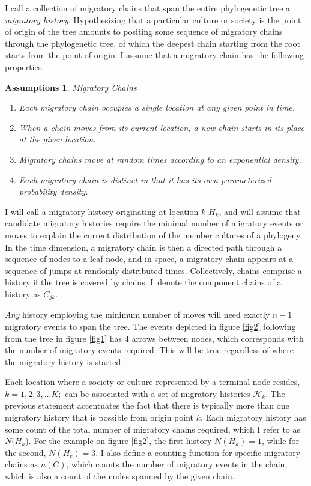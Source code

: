 \documentclass[11pt]{article}
\newtheorem{assumptions}{Assumptions}
\begin{document}
 I call a  collection of migratory chains that span the entire phylogenetic tree a \textit{migratory history}. Hypothesizing that a particular culture or society is the point of origin of the tree amounts to positing some sequence of migratory chains through the phylogenetic tree, of which the deepest chain starting from the root starts from the point of origin. I assume that a migratory chain has the following properties.

\begin{assumptions}{Migratory Chains}    
\begin{enumerate}
\item Each migratory chain occupies a single location at any given point in time.
\item When a chain moves from its current location, a new chain starts in its place at the given location.
\item Migratory chains move at random times according to an exponential density.
\item Each migratory chain is distinct in that it has its own parameterized probability density.
\end{enumerate}
\end{assumptions}
I will call a migratory history originating at location $k$ $H_k$, and will assume that candidate migratory histories require the minimal number of migratory events or moves to explain the current distribution of the member cultures of a phylogeny. In the time dimension, a migratory chain is then a directed path through a sequence of nodes to a leaf node, and in space, a migratory chain appears at a sequence of jumps at randomly distributed times. Collectively, chains comprise a history if the tree is covered by chains. I\ denote the component chains of a history as $C_{jk}$.

\textit{Any} history employing the minimum number of moves will need exactly $n-1$ migratory events to span the tree. The events depicted in figure \ref{fig2} following from the tree in figure \ref{fig1} has 4 arrows between nodes, which corresponds with the number of migratory events required. This will be true regardless of where the migratory history is started. 

Each location where a society or culture represented by a terminal node resides,  $k=1,2,3,\hdots K;$ can be associated with a set of migratory histories $\mathcal{H}_k$. The previous statement accentuates the fact that there is typically more than one migratory history that is possible from origin point $k$. Each migratory history has some count of the total number of migratory chains required, which I refer to as  $N(H_k$). For the example on figure \ref{fig2}, the first history $N(H_a)=1$, while for the second, $N(H_c)=3$.    I also define a counting function for specific migratory chains as $n(C)$, which counts the number of migratory events in the chain, which is also a count of the nodes spanned by the given chain. 
\end{document}

